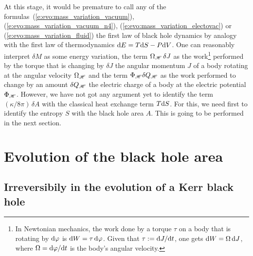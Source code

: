 At this stage, it would be premature to call any of the formulas~(\ref{e:evo:mass_variation_vacuum}),
(\ref{e:evo:mass_variation_vacuum_n4}), (\ref{e:evo:mass_variation_electovac})
or (\ref{e:evo:mass_variation_fluid})
the first law of black hole dynamics by analogy with the first law of thermodynamics
$\mathrm{d} E = T \mathrm{d} S - P \mathrm{d} V$. One can reasonably interpret $\delta M$
as some energy variation, the term
$\Omega_{\mathscr{H}} \, \delta J$ as the work\footnote{In Newtonian mechanics, the
work done by a torque $\tau$ on a body that is rotating by $\mathrm{d}\varphi$
is $\mathrm{d} W = \tau \, \mathrm{d}\varphi$. Given that $\tau := \mathrm{d} J/\mathrm{d} t$, one gets $\mathrm{d} W = \Omega \, \mathrm{d} J$, where
$\Omega = \mathrm{d}\varphi/\mathrm{d} t$ is the body's angular velocity.} performed by the torque
that is changing by $\delta J$ the angular momentum $J$ of a body rotating
at the angular velocity $\Omega_{\mathscr{H}}$ and the term $\Phi_{\mathscr{H}} \delta Q_{\mathscr{H}}$
as the work performed to change by an amount $\delta Q_{\mathscr{H}}$ the electric charge
of a body at the electric potential $\Phi_{\mathscr{H}}$.
However, we have not got any argument yet
to identify the term $(\kappa/8\pi) \, \delta A$ with the classical heat exchange term $T\mathrm{d} S$.
For this, we need first to identify the entropy $S$ with the black hole area $A$.
This is going to be performed in the next section.



\section{Evolution of the black hole area} \label{s:evo:evol_area}

\subsection{Irreversibily in the evolution of a Kerr black hole} \label{s:evo:irreversible_mass}

